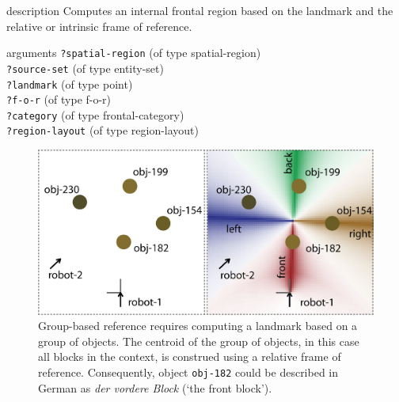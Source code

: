 \begin{explanation}{description}
Computes an internal frontal region based on the landmark
and the relative or intrinsic frame of reference.
\end{explanation}
\begin{explanation}{arguments}
{\footnotesize\verb+?spatial-region+} (of type spatial-region) \\
{\footnotesize\verb+?source-set+} (of type entity-set) \\
{\footnotesize\verb+?landmark+} (of type point)\\
{\footnotesize\verb+?f-o-r+} (of type f-o-r)\\
{\footnotesize\verb+?category+} (of type frontal-category)\\
{\footnotesize\verb+?region-layout+} (of type region-layout)
\vspace{0.3cm}
\end{explanation}

\begin{figure}
\begin{centering}
\includegraphics[width=0.7\columnwidth]{figs/space-scene-3483324847-group-based-reference.png}
\caption[Group-based reference explanation.]
{Group-based reference requires computing a landmark based on 
a group of objects. The centroid of the group of objects, in this case 
all blocks in the context, is construed using a relative frame of reference.
Consequently, object {\footnotesize\tt obj-182} could be described in German as 
\textit{der vordere Block} (`the front block').}
\label{f:space-scene-2}
\end{centering}
\end{figure}

